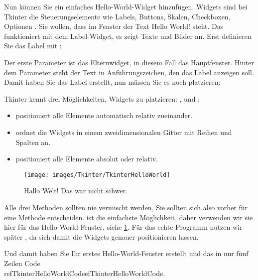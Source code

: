 Nun können Sie ein einfaches Hello-World-Widget hinzufügen. Widgets sind bei Tkinter die Steuerungselemente wie Labels, Buttons, Skalen, Checkboxen, Optionen . Sie wollen, dass im Fenster der Text Hello World! steht. Das funktioniert mit dem Label-Widget, es zeigt Texte und Bilder an. Erst definieren Sie das Label mit :

\medskip


\medskip

Der erste Parameter ist das Elternwidget, in diesem Fall das Hauptfenster. Hinter dem Parameter  steht der Text in Anführungszeichen, den das Label anzeigen soll. Damit haben Sie das Label erstellt, nun müssen Sie es noch platzieren:

\medskip



\medskip

Tkinter kennt drei Möglichkeiten, Widgets zu platzieren: ,  und :

\begin{itemize}
    \item {} positioniert alle Elemente automatisch relativ zueinander.
    \item {} ordnet die Widgets in einem zweidimensionalen Gitter mit Reihen und Spalten an.
    \item {} positioniert alle Elemente absolut oder relativ.
\end{itemize}


\begin{figure}
    \texttt{[image: images/Tkinter/TkinterHelloWorld]}
    \caption{Hallo Welt! Das war nicht schwer.} \label{TkinterHelloWorld}
\end{figure}


Alle drei Methoden sollten nie vermischt werden, Sie sollten sich also vorher für eine Methode entscheiden.  ist die einfachste Möglichkeit, daher verwenden wir sie hier für das Hello-World-Fenster, siehe \ref{TkinterHelloWorld}. Für das echte Programm nutzen wir später , da sich damit die Widgets genauer positionieren lassen.

Und damit haben Sie Ihr erstes Hello-World-Fenster erstellt und das in nur fünf Zeilen Code \\ref{TkinterHelloWorldCode}ef{TkinterHelloWorldCode}.

